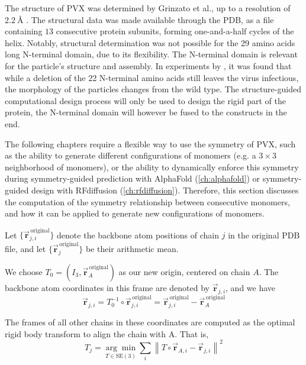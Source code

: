 The structure of PVX was determined by Grinzato et al., up to a resolution of $\SI{2.2}{\angstrom}$ \cite{Grinzato2020}. The structural data was made available through the PDB, as a file containing $13$ consecutive protein subunits, forming one-and-a-half cycles of the helix. Notably, structural determination was not possible for the 29 amino acids long N-terminal domain, due to its flexibility. The N-terminal domain is relevant for the particle's structure and assembly. In experiments by \cite{del22_rigid}, it was found that while a deletion of the 22 N-terminal amino acids still leaves the virus infectious, the morphology of the particles changes from the wild type. The structure-guided computational design process will only be used to design the rigid part of the protein, the N-terminal domain will however be fused to the constructs in the end. 

The following chapters require a flexible way to use the symmetry of PVX, such as the ability to generate different configurations of monomers (e.g. a $3 \times 3$ neighborhood of monomers), or the ability to dynamically enforce this symmetry during symmetry-guided prediction with AlphaFold (\autoref{ch:alphafold}) or symmetry-guided design with RFdiffusion (\autoref{ch:rfdiffusion}). Therefore, this section discusses the computation of the symmetry relationship between consecutive monomers, and how it can be applied to generate new configurations of monomers.

Let $\{\vec{\mathbf{r}}_{j,i}^{\,\text{original}}\}$ denote the backbone atom positions of chain $j$ in the original PDB file, and let $\{\vec{\mathbf{r}}_{j}^{\,\text{original}}\}$ be their arithmetic mean. 

We choose $T_0 = (I_3, \vec{\mathbf{r}}_A^{\,\text{original}})$ as our new origin, centered on chain $A$. The backbone atom coordinates in this frame are denoted by $\vec{\mathbf{r}}_{j,i}$, and we have
\begin{equation}
    \vec{\mathbf{r}}_{j,i} = T_0^{-1} \circ \vec{\mathbf{r}}_{j,i}^{\,\text{original}} = \vec{\mathbf{r}}_{j,i}^{\,\text{original}} - \vec{\mathbf{r}}_{A}^{\,\text{original}}
\end{equation}

The frames of all other chains in these coordinates are computed as the optimal rigid body transform to align the chain with A. That is,
\begin{equation}
T_j = \underset{T \in \mathrm{SE}(3)}{\arg\min} \sum_i \left\| T\circ\vec{\mathbf{r}}_{A,i} - \vec{\mathbf{r}}_{j,i} \right\|^2
\end{equation}

